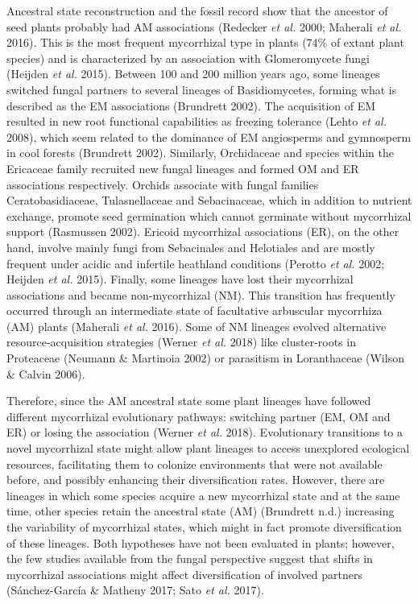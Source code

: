 \documentclass[12pt,]{article}
\begin{document}
Ancestral state reconstruction and the fossil record show that the
ancestor of seed plants probably had AM associations (Redecker \emph{et
al.} 2000; Maherali \emph{et al.} 2016). This is the most frequent
mycorrhizal type in plants (74\% of extant plant species) and is
characterized by an association with Glomeromycete fungi (Heijden
\emph{et al.} 2015). Between 100 and 200 million years ago, some
lineages switched fungal partners to several lineages of Basidiomycetes,
forming what is described as the EM associations (Brundrett 2002). The
acquisition of EM resulted in new root functional capabilities as
freezing tolerance (Lehto \emph{et al.} 2008), which seem related to the
dominance of EM angiosperms and gymnosperm in cool forests (Brundrett
2002). Similarly, Orchidaceae and species within the Ericaceae family
recruited new fungal lineages and formed OM and ER associations
respectively. Orchids associate with fungal families Ceratobasidiaceae,
Tulasnellaceae and Sebacinaceae, which in addition to nutrient exchange,
promote seed germination which cannot germinate without mycorrhizal
support (Rasmussen 2002). Ericoid mycorrhizal associations (ER), on the
other hand, involve mainly fungi from Sebacinales and Helotiales and are
mostly frequent under acidic and infertile heathland conditions (Perotto
\emph{et al.} 2002; Heijden \emph{et al.} 2015). Finally, some lineages
have lost their mycorrhizal associations and became non-mycorrhizal
(NM). This transition has frequently occurred through an intermediate
state of facultative arbuscular mycorrhiza (AM) plants (Maherali
\emph{et al.} 2016). Some of NM lineages evolved alternative
resource-acquisition strategies (Werner \emph{et al.} 2018) like
cluster-roots in Proteaceae (Neumann \& Martinoia 2002) or parasitism in
Loranthaceae (Wilson \& Calvin 2006).

Therefore, since the AM ancestral state some plant lineages have
followed different mycorrhizal evolutionary pathways: switching partner
(EM, OM and ER) or losing the association (Werner \emph{et al.} 2018).
Evolutionary transitions to a novel mycorrhizal state might allow plant
lineages to access unexplored ecological resources, facilitating them to
colonize environments that were not available before, and possibly
enhancing their diversification rates. However, there are lineages in
which some species acquire a new mycorrhizal state and at the same time,
other species retain the ancestral state (AM) (Brundrett n.d.)
increasing the variability of mycorrhizal states, which might in fact
promote diversification of these lineages. Both hypotheses have not been
evaluated in plants; however, the few studies available from the fungal
perspective suggest that shifts in mycorrhizal associations might affect
diversification of involved partners (Sánchez-García \& Matheny 2017;
Sato \emph{et al.} 2017).
\end{document}
